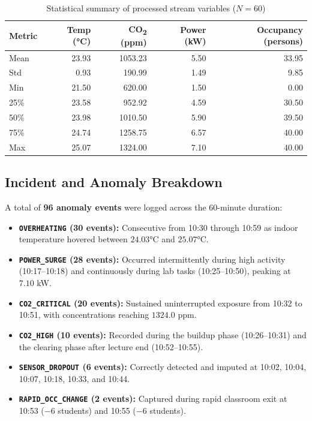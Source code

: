 \documentclass[12pt,a4paper]{article}
\begin{document}
\begin{table}[ht!]
\centering
\caption{Statistical summary of processed stream variables ($N=60$)}
\label{tab:summary_stats}
\begin{tabular}{lrrrr}
\toprule
\textbf{Metric} & \textbf{Temp (°C)} & \textbf{CO\textsubscript{2} (ppm)} & \textbf{Power (kW)} & \textbf{Occupancy (persons)} \\
\midrule
Mean   & 23.93 & 1053.23 & 5.50 & 33.95 \\
Std    &  0.93 &  190.99 & 1.49 &  9.85 \\
Min    & 21.50 &  620.00 & 1.50 &  0.00 \\
25\%   & 23.58 &  952.92 & 4.59 & 30.50 \\
50\%   & 23.98 & 1010.50 & 5.90 & 39.50 \\
75\%   & 24.74 & 1258.75 & 6.57 & 40.00 \\
Max    & 25.07 & 1324.00 & 7.10 & 40.00 \\
\bottomrule
\end{tabular}
\end{table}

\subsection{Incident and Anomaly Breakdown}

A total of \textbf{96 anomaly events} were logged across the 60-minute duration:
\begin{itemize}
  \item \textbf{\texttt{OVERHEATING} (30 events):} Consecutive from 10:30 through 10:59 as indoor temperature hovered between $24.03$°C and $25.07$°C.
  \item \textbf{\texttt{POWER\_SURGE} (28 events):} Occurred intermittently during high activity (10:17--10:18) and continuously during lab tasks (10:25--10:50), peaking at $7.10$ kW.
  \item \textbf{\texttt{CO2\_CRITICAL} (20 events):} Sustained uninterrupted exposure from 10:32 to 10:51, with concentrations reaching $1324.0$ ppm.
  \item \textbf{\texttt{CO2\_HIGH} (10 events):} Recorded during the buildup phase (10:26--10:31) and the clearing phase after lecture end (10:52--10:55).
  \item \textbf{\texttt{SENSOR\_DROPOUT} (6 events):} Correctly detected and imputed at 10:02, 10:04, 10:07, 10:18, 10:33, and 10:44.
  \item \textbf{\texttt{RAPID\_OCC\_CHANGE} (2 events):} Captured during rapid classroom exit at 10:53 ($-6$ students) and 10:55 ($-6$ students).
\end{itemize}
\end{document}
